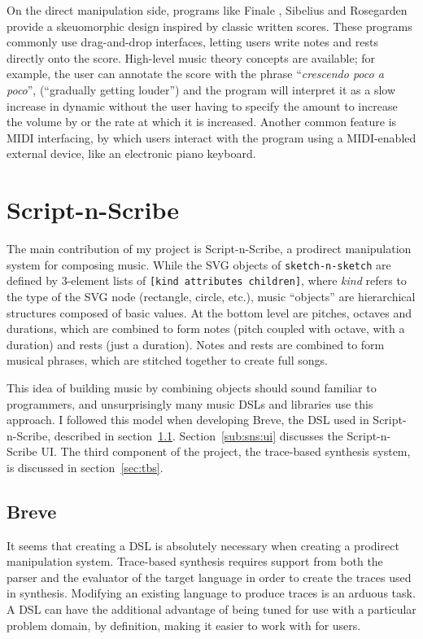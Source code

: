 \documentclass[nocopyrightspace,numbers,10pt]{sigplanconf}
\newcommand{\sketch}{\texttt{sketch-n-sketch}}
\newcommand{\sns}{Script-n-Scribe}
\begin{document}
On the direct manipulation side, programs like Finale \cite{finale}, Sibelius
\cite{sibelius} and Rosegarden \cite{rosegarden} provide a skeuomorphic design
inspired by classic written scores. These programs commonly use drag-and-drop
interfaces, letting users write notes and rests directly onto the score.
High-level music theory concepts are available; for example, the user can
annotate the score with the phrase ``\emph{crescendo poco a poco}'',
(``gradually getting louder'') and the program will interpret it as a slow
increase in dynamic without the user having to specify the amount to increase
the volume by or the rate at which it is increased. Another common feature is
MIDI interfacing, by which users interact with the program using a MIDI-enabled
external device, like an electronic piano keyboard.

\section{Script-n-Scribe}
\label{sec:sns}

The main contribution of my project is Script-n-Scribe, a prodirect manipulation
system for composing music. While the SVG objects of \sketch{} are defined by
3-element lists of \texttt{[kind attributes children]}, where \emph{kind} refers
to the type of the SVG node (rectangle, circle, etc.), music ``objects'' are
hierarchical structures composed of basic values. At the bottom level are
pitches, octaves and durations, which are combined to form notes (pitch coupled
with octave, with a duration) and rests (just a duration). Notes and rests are
combined to form musical phrases, which are stitched together to create full
songs.

This idea of building music by combining objects should sound familiar to
programmers, and unsurprisingly many music DSLs and libraries use this approach.
I followed this model when developing Breve, the DSL used in \sns, described in
section~\ref{sub:sns:breve}. Section~\ref{sub:sns:ui} discusses the \sns{} UI.
The third component of the project, the trace-based synthesis system, is
discussed in section~\ref{sec:tbs}.

\subsection{Breve}
\label{sub:sns:breve}

It seems that creating a DSL is absolutely necessary when creating a prodirect
manipulation system. Trace-based synthesis requires support from both the parser
and the evaluator of the target language in order to create the traces used in
synthesis. Modifying an existing language to produce traces is an arduous task.
A DSL can have the additional advantage of being tuned for use with a particular
problem domain, by definition, making it easier to work with for users.
\end{document}
